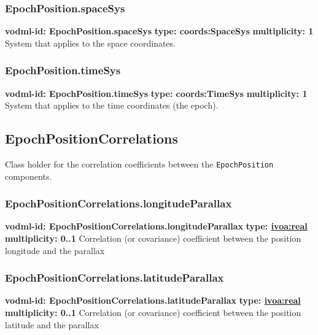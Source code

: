     \subsubsection{EpochPosition.spaceSys}
    \textbf{vodml-id: EpochPosition.spaceSys} \newline
    \textbf{type: coords:SpaceSys} \newline
    \textbf{multiplicity: 1} \newline
    System that applies to the space coordinates.

    \subsubsection{EpochPosition.timeSys}
    \textbf{vodml-id: EpochPosition.timeSys} \newline
    \textbf{type: coords:TimeSys} \newline
    \textbf{multiplicity: 1} \newline
    System that applies to the time coordinates (the epoch).

  \subsection{EpochPositionCorrelations}
    \label{sect:EpochPositionCorrelations}
    Class holder for the correlation coefficients between the \texttt{EpochPosition} components.

    \subsubsection{EpochPositionCorrelations.longitudeParallax}
    \textbf{vodml-id: EpochPositionCorrelations.longitudeParallax} \newline
    \textbf{type: \hyperref[sect:ivoa]{ivoa:real}} \newline
    \textbf{multiplicity: 0..1} \newline
    Correlation (or covariance) coefficient between the position longitude and the parallax

    \subsubsection{EpochPositionCorrelations.latitudeParallax}
    \textbf{vodml-id: EpochPositionCorrelations.latitudeParallax} \newline
    \textbf{type: \hyperref[sect:ivoa]{ivoa:real}} \newline
    \textbf{multiplicity: 0..1} \newline
    Correlation (or covariance) coefficient between the position latitude and the parallax

